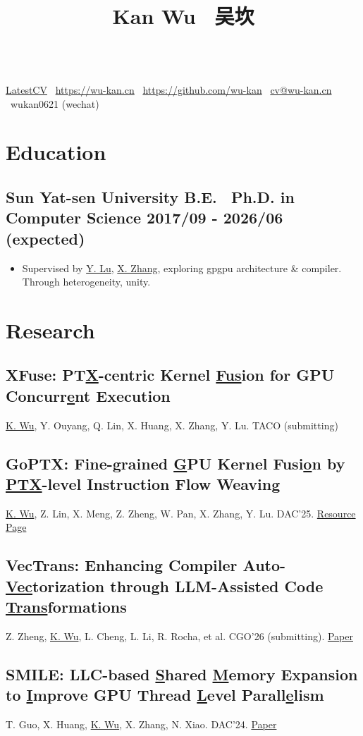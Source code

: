 \documentclass[
    scheme=plain
]{ctexart}
\title{Kan Wu \textperiodcentered\ 吴坎}
\makeatletter
\newcommand{\datedsubsection}[2]{%
\subsection[#1]{#1 \hfill #2}
}
\renewcommand\maketitle{
\begin{center}
  {\LARGE\textbf{\@title}}\\
  \href{https://resume.wu-kan.cn}{LatestCV}
  \textperiodcentered\
  \url{https://wu-kan.cn}
  \textperiodcentered\
  \url{https://github.com/wu-kan}
  \textperiodcentered\
  \href{mailto:cv@wu-kan.cn}{cv@wu-kan.cn}
  \textperiodcentered\
  {wukan0621 (wechat)}
\end{center}
}
\makeatother
\begin{document}
\maketitle

\section{Education}

\datedsubsection{\textbf{Sun Yat-sen University} \quad B.E. \textperiodcentered\ Ph.D. \quad in Computer Science}{2017/09 - 2026/06 (expected)}

\begin{itemize}
  \item Supervised by \href{https://cse.sysu.edu.cn/teacher/LuYutong}{Y. Lu}, \href{https://cse.sysu.edu.cn/teacher/ZhangXianwei}{X. Zhang}, exploring gpgpu architecture \& compiler. Through heterogeneity, unity. 
\end{itemize}

\section{Research}

\datedsubsection{\textbf{XFuse: PT\underline{X}-centric Kernel \underline{Fus}ion for GPU Concurr\underline{e}nt Execution}}{}

\underline{K. Wu}, Y. Ouyang, Q. Lin, X. Huang, X. Zhang, Y. Lu. TACO (submitting)

\datedsubsection{\textbf{GoPTX: Fine-grained \underline{G}PU Kernel Fusi\underline{o}n by \underline{PTX}-level Instruction Flow Weaving}}{}

\underline{K. Wu}, Z. Lin, X. Meng, Z. Zheng, W. Pan, X. Zhang, Y. Lu. DAC'25. \href{https://wu-kan.cn/2025/06/25/DAC25-GoPTX/}{Resource Page}

\datedsubsection{\textbf{VecTrans: Enhancing Compiler Auto-\underline{Vec}torization through LLM-Assisted Code \underline{Trans}formations}}{}

Z. Zheng, \underline{K. Wu}, L. Cheng, L. Li, R. Rocha, et al. CGO'26 (submitting). \href{https://arxiv.org/abs/2503.19449}{Paper}

\datedsubsection{\textbf{SMILE: LLC-based \underline{S}hared \underline{M}emory Expansion to \underline{I}mprove GPU Thread \underline{L}evel Parall\underline{e}lism}}{}

T. Guo, X. Huang, \underline{K. Wu}, X. Zhang, N. Xiao. DAC'24. \href{https://dl.acm.org/doi/10.1145/3649329.3655906}{Paper}
\end{document}
